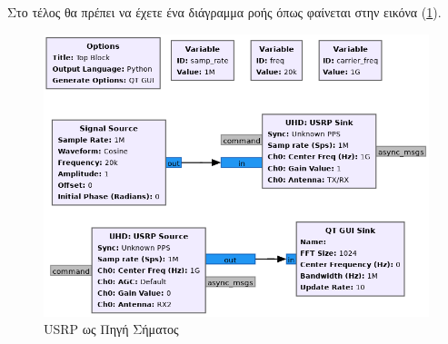 \documentclass[12pt]{report}
\begin{document}
            Στο τέλος θα πρέπει να έχετε ένα διάγραμμα ροής όπως φαίνεται στην εικόνα (\ref{img:USRPsrc}).
            \begin{figure}[h]
                \centering
                \includegraphics[width=.8\textwidth]{ex3_flow.png}
                \caption{USRP ως Πηγή Σήματος}
                \label{img:USRPsrc}
            \end{figure}
\end{document}
